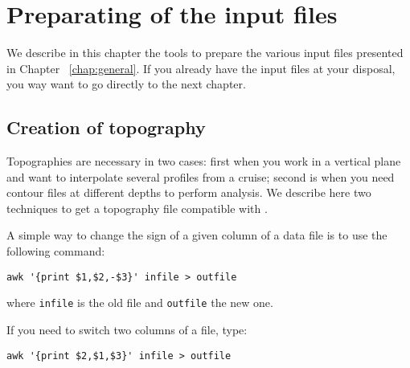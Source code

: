 \chapter{Preparating of the input files\label{Preprocessing}}

We describe in this chapter the tools to prepare the various input files presented in Chapter~ \ref{chap:general}. If you already have the input files at your disposal, you way want to go directly to the next chapter.

\minitoc

\section{Creation of topography\label{sec:howtotopo}}

Topographies are necessary in two cases: first when you work in a vertical plane and want to interpolate several profiles from a cruise; second is when you need contour files at different depths to perform analysis. We describe here two techniques to get a topography file compatible with \diva.


\begin{center}
\end{center}

\btips
A simple way to change the sign of a given column of a data file is to use the following command:
\begin{verbatim}
awk '{print $1,$2,-$3}' infile > outfile
\end{verbatim}
where \texttt{infile} is the old file and \texttt{outfile} the new one.

If you need to switch two columns of a file, type:
\begin{verbatim}
awk '{print $2,$1,$3}' infile > outfile
\end{verbatim}
\etips



